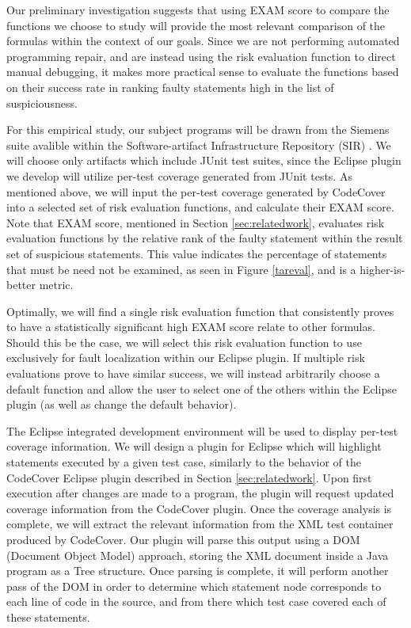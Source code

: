 \documentclass[11pt]{article}
\begin{document}
Our preliminary investigation suggests that using EXAM score to compare 
the functions we choose to study will provide the most relevant comparison 
of the formulas within the context of our goals.  Since we are not performing
automated programming repair, and are instead using the risk evaluation
function to direct manual debugging, it makes more practical sense
to evaluate the functions based on their success rate in ranking faulty
statements high in the list of suspiciousness.

For this empirical study, our subject programs will be drawn from the 
Siemens suite avalible within the Software-artifact Infrastructure 
Repository (SIR) \cite{sir}.  We will choose only artifacts which include
JUnit test suites, since the Eclipse plugin we develop will 
utilize per-test coverage generated from JUnit tests.  As mentioned above,
we will input the per-test coverage generated by CodeCover into a selected
set of risk evaluation functions, and calculate their EXAM score.  Note
that EXAM score, mentioned in Section \ref{sec:relatedwork}, evaluates risk evaluation
functions by the relative rank of the faulty statement within the result
set of suspicious statements.  This value indicates the percentage of
statements that must be need not be examined, as seen in Figure \ref{tareval},
and is a higher-is-better metric.

Optimally, we will find a single risk evaluation function that consistently
proves to have a statistically significant high EXAM score relate to 
other formulas.  Should this be the case, we will select this risk evaluation
function to use exclusively for fault localization within our Eclipse
plugin.  If multiple risk evaluations prove to have similar success, we
will instead arbitrarily choose a default function and allow the user to
select one of the others within the Eclipse plugin (as well as change the
default behavior).

The Eclipse integrated development environment will be used to display
per-test coverage information.  We will design a plugin for Eclipse
which will highlight statements executed by a given test case, similarly
to the behavior of the CodeCover Eclipse plugin described in Section \ref{sec:relatedwork}.  Upon first
execution after changes are made to a program, the plugin will request updated
coverage information from the CodeCover plugin.  Once the coverage analysis
is complete, we will extract the relevant information from the XML test
container produced by CodeCover.  Our plugin will parse this output using a
DOM (Document Object Model) approach, storing the XML document inside a Java
program as a Tree structure.  Once parsing is complete, it will perform another
pass of the DOM in order to determine which statement node corresponds to each
line of code in the source, and from there which test case covered each of these
statements.
\end{document}
